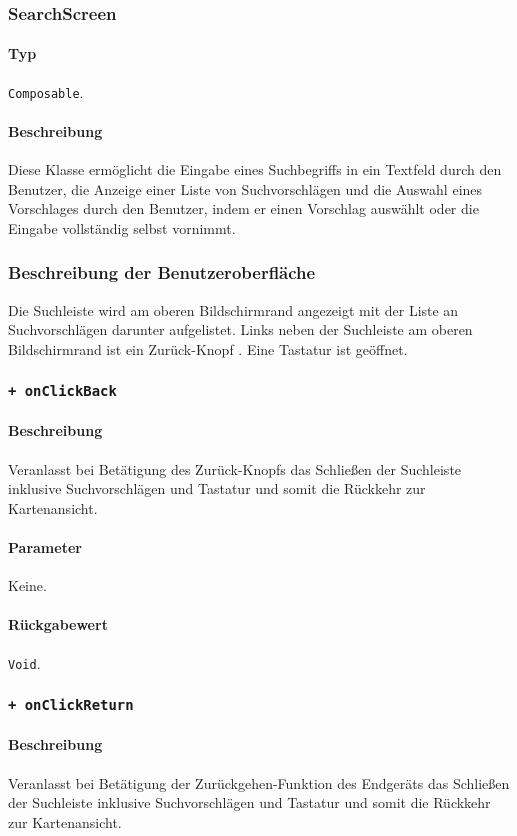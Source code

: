 \subsubsection{SearchScreen}
\paragraph*{Typ}
\texttt{Composable}.
\paragraph*{Beschreibung}
Diese Klasse ermöglicht die Eingabe eines Suchbegriffs in ein Textfeld durch den Benutzer, 
die Anzeige einer Liste von Suchvorschlägen und die Auswahl eines Vorschlages durch den Benutzer, 
indem er einen Vorschlag auswählt oder die Eingabe vollständig selbst vornimmt.

\subsubsection*{Beschreibung der Benutzeroberfläche}
Die Suchleiste wird am oberen Bildschirmrand angezeigt mit der Liste an Suchvorschlägen darunter aufgelistet.
Links neben der Suchleiste am oberen Bildschirmrand ist ein \dq Zurück-Knopf \dq{}.
Eine Tastatur ist geöffnet.

\subsubsection*{\texttt{+ onClickBack}}%
\paragraph*{Beschreibung}
Veranlasst bei Betätigung des \dq Zurück-Knopfs \dq{} das Schließen der Suchleiste inklusive Suchvorschlägen und Tastatur und somit die Rückkehr zur Kartenansicht.
\paragraph*{Parameter}
Keine.
\paragraph*{Rückgabewert}
\texttt{Void}.

\subsubsection*{\texttt{+ onClickReturn}}%
\paragraph*{Beschreibung}
Veranlasst bei Betätigung der Zurückgehen-Funktion des Endgeräts das Schließen der Suchleiste inklusive Suchvorschlägen und Tastatur und somit die Rückkehr zur Kartenansicht.
